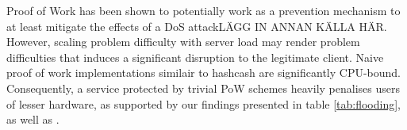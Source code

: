 Proof of Work has been shown to potentially work as a prevention mechanism to at least mitigate the effects of a DoS attack\cite{subpuzzles}LÄGG IN ANNAN KÄLLA HÄR. However, scaling problem difficulty with server load may render problem difficulties that induces a significant disruption to the legitimate client. Naive proof of work implementations similair to hashcash are significantly CPU-bound\cite{hashcashbench}. Consequently, a service protected by trivial PoW schemes heavily penalises users of lesser hardware, as supported by our findings presented in table \ref{tab:flooding}, as well as \citeauthor{Tsang2008}\cite{Tsang2008}.

\begin{comment}
Proof of Work has been shown to potentially work as a prevention mechanism to at least mitigate the effects of a DoS attack without making an as assumption about the source.[källa] However, \citeauthor{LaurieC04} concluded in the paper \citetitle{LaurieC04}, that PoW on it's own, is not a feasible solution to fighting spam and denial of service attacks. This is because the classical implementation of Proof of Work does not seperate legitimate users from attackers. Hence, problems from a Proof of Work protected system would not discourage abusers of the system without having an unacceptable effect on legitimate users. 
\end{comment}